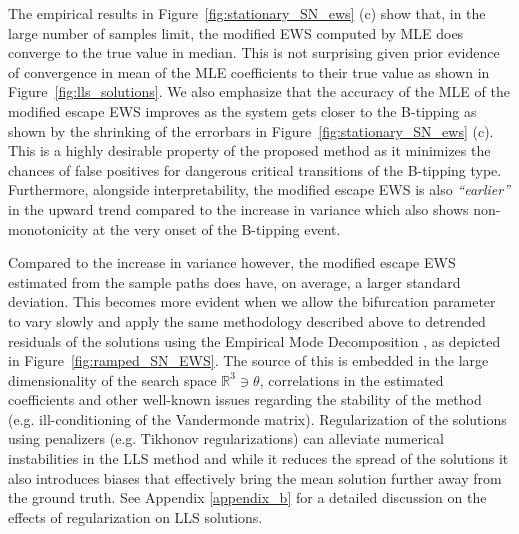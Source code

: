 \documentclass[10pt]{article}
\newcommand{\fref}[1]{Figure~\ref{#1}}
\begin{document}
The empirical results in \fref{fig:stationary_SN_ews} (c) show that, in the large number of samples limit, the modified EWS computed by MLE does converge to the true value in median.
This is not surprising given prior evidence of convergence in mean of the MLE coefficients to their true value as shown in \fref{fig:lls_solutions}.
We also emphasize that the accuracy of the MLE of the modified escape EWS improves as the system gets closer to the B-tipping as shown by the shrinking of the errorbars in \fref{fig:stationary_SN_ews} (c).
This is a highly desirable property of the proposed method as it minimizes the chances of false positives for dangerous critical transitions of the B-tipping type.
Furthermore, alongside interpretability, the modified escape EWS is also \textit{``earlier''} in the upward trend compared to the increase in variance which also shows non-monotonicity at the very onset of the B-tipping event.

Compared to the increase in variance however, the modified escape EWS estimated from the sample paths does have, on average, a larger standard deviation.
This becomes more evident when we allow the bifurcation parameter to vary slowly and apply the same methodology described above to detrended residuals of the solutions using the Empirical Mode Decomposition \cite{Huang1998}, as depicted in \fref{fig:ramped_SN_EWS}.
The source of this is embedded in the large dimensionality of the search space $\mathbb{R}^{3}\ni\theta$, correlations in the estimated coefficients and other well-known issues regarding the stability of the method (e.g. ill-conditioning of the Vandermonde matrix).
Regularization of the solutions using penalizers (e.g. Tikhonov regularizations) can alleviate numerical instabilities in the LLS method and while it reduces the spread of the solutions it also introduces biases that effectively bring the mean solution further away from the ground truth.
See Appendix \ref{appendix_b} for a detailed discussion on the effects of regularization on LLS solutions.
%
\end{document}
